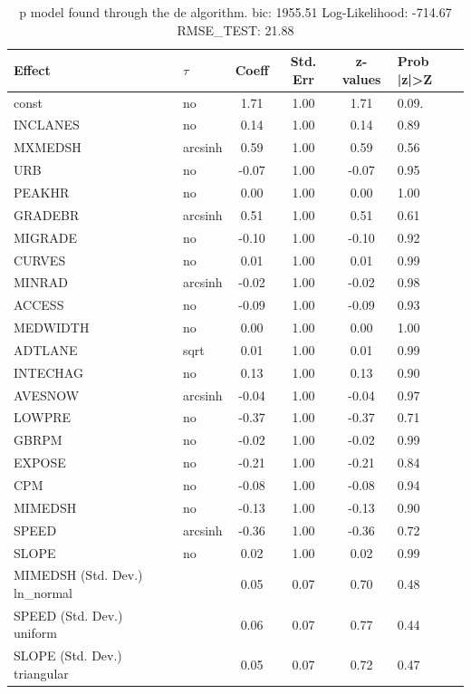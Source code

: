 \begin{table}
	\caption{p model found through the de algorithm. bic: 1955.51 Log-Likelihood: -714.67 RMSE_TEST: 21.88}
	\begin{center}
		\begin{tabular}{|l|l|c|c|c|l|}
			\hline
			Effect & $\tau$ & Coeff & Std. Err & z-values & Prob |z|>Z \\
			\hline
			const & no & 1.71 & 1.00 & 1.71 & 0.09. \\
			\hline
			INCLANES & no & 0.14 & 1.00 & 0.14 & 0.89 \\
			\hline
			MXMEDSH & arcsinh & 0.59 & 1.00 & 0.59 & 0.56 \\
			\hline
			URB & no & -0.07 & 1.00 & -0.07 & 0.95 \\
			\hline
			PEAKHR & no & 0.00 & 1.00 & 0.00 & 1.00 \\
			\hline
			GRADEBR & arcsinh & 0.51 & 1.00 & 0.51 & 0.61 \\
			\hline
			MIGRADE & no & -0.10 & 1.00 & -0.10 & 0.92 \\
			\hline
			CURVES & no & 0.01 & 1.00 & 0.01 & 0.99 \\
			\hline
			MINRAD & arcsinh & -0.02 & 1.00 & -0.02 & 0.98 \\
			\hline
			ACCESS & no & -0.09 & 1.00 & -0.09 & 0.93 \\
			\hline
			MEDWIDTH & no & 0.00 & 1.00 & 0.00 & 1.00 \\
			\hline
			ADTLANE & sqrt & 0.01 & 1.00 & 0.01 & 0.99 \\
			\hline
			INTECHAG & no & 0.13 & 1.00 & 0.13 & 0.90 \\
			\hline
			AVESNOW & arcsinh & -0.04 & 1.00 & -0.04 & 0.97 \\
			\hline
			LOWPRE & no & -0.37 & 1.00 & -0.37 & 0.71 \\
			\hline
			GBRPM & no & -0.02 & 1.00 & -0.02 & 0.99 \\
			\hline
			EXPOSE & no & -0.21 & 1.00 & -0.21 & 0.84 \\
			\hline
			CPM & no & -0.08 & 1.00 & -0.08 & 0.94 \\
			\hline
			MIMEDSH & no & -0.13 & 1.00 & -0.13 & 0.90 \\
			\hline
			SPEED & arcsinh & -0.36 & 1.00 & -0.36 & 0.72 \\
			\hline
			SLOPE & no & 0.02 & 1.00 & 0.02 & 0.99 \\
			\hline
			MIMEDSH (Std. Dev.) ln_normal &  & 0.05 & 0.07 & 0.70 & 0.48 \\
			\hline
			SPEED (Std. Dev.) uniform &  & 0.06 & 0.07 & 0.77 & 0.44 \\
			\hline
			SLOPE (Std. Dev.) triangular &  & 0.05 & 0.07 & 0.72 & 0.47 \\
			\hline
		\end{tabular}
	\end{center}
\end{table}